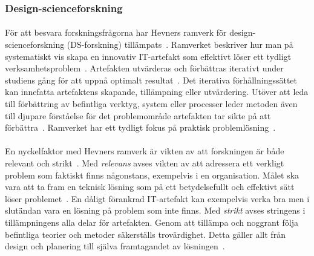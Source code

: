 \subsubsection{Design-scienceforskning}
\paragraph{}
\hspace{-11pt}För att besvara forskningsfrågorna har Hevners ramverk för design-scienceforskning (DS-forskning) tillämpats~\cite{Hevner2004}.
Ramverket beskriver hur man på systematiskt vis skapa en innovativ IT-artefakt som effektivt löser ett tydligt verksamhetsproblem~\cite{Hevner2004}.
Artefakten utvärderas och förbättras iterativt under studiens gång för att uppnå optimalt resultat~\cite{Hevner2004}.
Det iterativa förhållningssättet kan innefatta artefaktens skapande, tillämpning eller utvärdering.
Utöver att leda till förbättring av befintliga verktyg, system eller processer leder metoden även till djupare förståelse för det problemområde artefakten tar sikte på att förbättra~\cite{Hevner2004}.
Ramverket har ett tydligt fokus på praktisk problemlösning~\cite{Hevner2004}.
\paragraph{}
\hspace{-11pt}En nyckelfaktor med Hevners ramverk är vikten av att forskningen är både relevant och strikt~\cite{Hevner2004}.
Med \emph{relevans} avses vikten av att adressera ett verkligt problem som faktiskt finns någonstans, exempelvis i en organisation.
Målet ska vara att ta fram en teknisk lösning som på ett betydelsefullt och effektivt sätt löser problemet~\cite{Hevner2004}.
En dåligt förankrad IT-artefakt kan exempelvis verka bra men i slutändan vara en lösning på problem som inte finns.
Med \emph{strikt} avses stringens i tillämpningens alla delar för artefakten.
Genom att tillämpa och noggrant följa befintliga teorier och metoder säkerställs trovärdighet.
Detta gäller allt från design och planering till själva framtagandet av lösningen~\cite{Hevner2004}.
